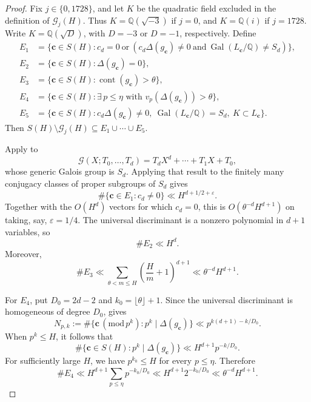\documentclass[12pt,reqno]{amsart}
\numberwithin{equation}{section}
\theoremstyle{definition}
\renewcommand{\le}{\leqslant}
\newcommand{\QQ}{\mathbb{Q}}
\newcommand{\cc}{\mathbf{c}}
\DeclareMathOperator{\Gal}{Gal}
\DeclareMathOperator{\cont}{cont}
\renewcommand{\pmod}[1]{\,(\mathrm{mod}\,#1)}
\begin{document}
\begin{proof}
Fix $j\in\{0,1728\}$, and let $K$ be the quadratic field excluded in the definition of $\mathcal G_j(H)$.
Thus $K=\QQ(\sqrt{-3})$ if $j=0$, and $K=\QQ(i)$ if $j=1728$.
Write $K=\QQ(\sqrt D)$, with $D=-3$ or $D=-1$, respectively.
Define
\[
\begin{aligned}
E_1&=\{\cc\in S(H):c_d=0\ \text{or}\
   (c_d\Delta(g_\cc)\ne0\ \text{and}\ \Gal(L_\cc/\QQ)\ne S_d)\},\\
E_2&=\{\cc\in S(H):\Delta(g_\cc)=0\},\\
E_3&=\{\cc\in S(H):\cont(g_\cc)>\theta\},\\
E_4&=\{\cc\in S(H):\exists\,p\le\eta
   \text{ with }v_p(\Delta(g_\cc))>\theta\},\\
E_5&=\{\cc\in S(H):c_d\Delta(g_\cc)\ne0,\
   \Gal(L_\cc/\QQ)=S_d,\ K\subset L_\cc\}.
\end{aligned}
\]
Then $S(H)\setminus\mathcal G_j(H)\subseteq E_1\cup\cdots\cup E_5$.

Apply \cite[Corollary~1]{CD} to
\[
\mathcal G(X;T_0,\ldots,T_d)=T_dX^d+\cdots+T_1X+T_0,
\]
whose generic Galois group is $S_d$.
Applying that result to the finitely many conjugacy classes of proper subgroups of $S_d$ gives
\[
\#\{\cc\in E_1:c_d\ne0\}\ll H^{d+1/2+\varepsilon}.
\]
Together with the $O(H^d)$ vectors for which $c_d=0$, this is $O(\theta^{-d}H^{d+1})$ on taking, say, $\varepsilon=1/4$.
The universal discriminant is a nonzero polynomial in $d+1$ variables, so
\[
\#E_2\ll H^d.
\]
Moreover,
\[
\#E_3
\ll\sum_{\theta<m\le H}\left(\frac Hm+1\right)^{d+1}
\ll\theta^{-d}H^{d+1}.
\]

For $E_4$, put $D_0=2d-2$ and $k_0=\lfloor\theta\rfloor+1$.
Since the universal discriminant is homogeneous of degree $D_0$, \cite[Lemma~4.10]{PSW} gives
\[
N_{p,k}:=\#\{\cc\pmod{p^k}:p^k\mid\Delta(g_\cc)\}
\ll p^{k(d+1)-k/D_0}.
\]
When $p^k\le H$, it follows that
\[
\#\{\cc\in S(H):p^k\mid\Delta(g_\cc)\}
\ll H^{d+1}p^{-k/D_0}.
\]
For sufficiently large $H$, we have $p^{k_0}\le H$ for every $p\le\eta$.
Therefore
\[
\#E_4
\ll H^{d+1}\sum_{p\le\eta}p^{-k_0/D_0}
\ll H^{d+1}2^{-k_0/D_0}
\ll\theta^{-d}H^{d+1}.
\]


\end{proof}
\end{document}
